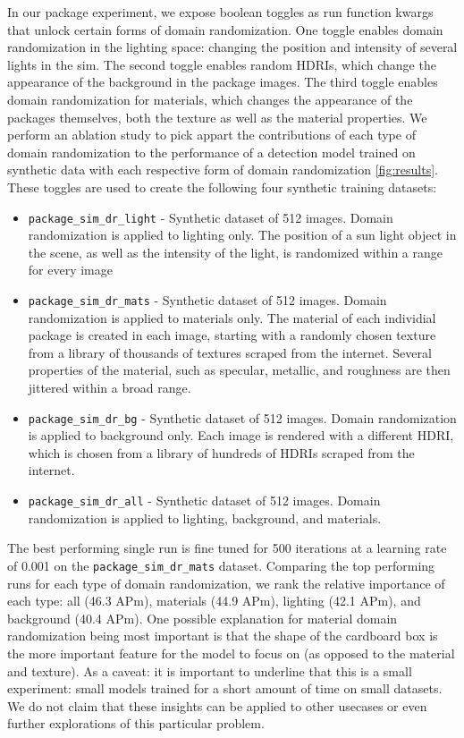 \documentclass{article}
\begin{document}
In our package experiment, we expose boolean toggles as run function kwargs that unlock certain forms of domain randomization. One toggle enables domain randomization in the lighting space: changing the position and intensity of several lights in the sim. The second toggle enables random HDRIs, which change the appearance of the background in the package images. The third toggle enables domain randomization for materials, which changes the appearance of the packages themselves, both the texture as well as the material properties. We perform an ablation study to pick appart the contributions of each type of domain randomization to the performance of a detection model trained on synthetic data with each respective form of domain randomization \ref{fig:results}. These toggles are used to create the following four synthetic training datasets:

\begin{itemize}
	\item \lstinline{package_sim_dr_light} - Synthetic dataset of 512 images. Domain randomization is applied to lighting only. The position of a sun light object in the scene, as well as the intensity of the light, is randomized within a range for every image
	\item \lstinline{package_sim_dr_mats} - Synthetic dataset of 512 images. Domain randomization is applied to materials only. The material of each individial package is created in each image, starting with a randomly chosen texture from a library of thousands of textures scraped from the internet. Several properties of the material, such as specular, metallic, and roughness are then jittered within a broad range.
	\item \lstinline{package_sim_dr_bg} - Synthetic dataset of 512 images. Domain randomization is applied to background only. Each image is rendered with a different HDRI, which is chosen from a library of hundreds of HDRIs scraped from the internet.
	\item \lstinline{package_sim_dr_all} - Synthetic dataset of 512 images. Domain randomization is applied to lighting, background, and materials.
\end{itemize}

The best performing single run is fine tuned for 500 iterations at a learning rate of 0.001 on the \lstinline{package_sim_dr_mats} dataset. Comparing the top performing runs for each type of domain randomization, we rank the relative importance of each type: all (46.3 APm), materials (44.9 APm),  lighting (42.1 APm), and background (40.4 APm). One possible explanation for material domain randomization being most important is that the shape of the cardboard box is the more important feature for the model to focus on (as opposed to the material and texture). As a caveat: it is important to underline that this is a small experiment: small models trained for a short amount of time on small datasets. We do not claim that these insights can be applied to other usecases or even further explorations of this particular problem. 
\end{document}
